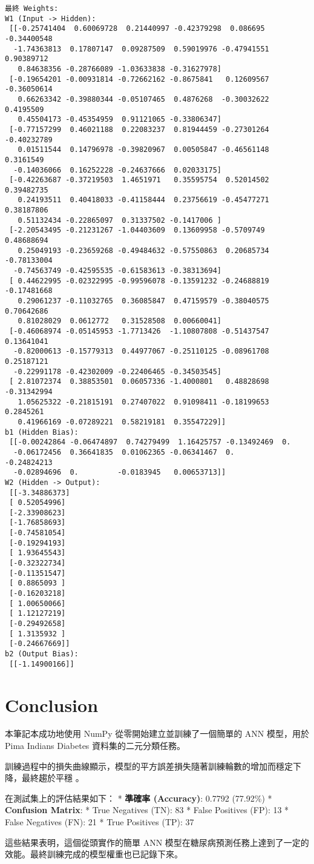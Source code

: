 \documentclass[11pt]{article}
\begin{document}
    \begin{Verbatim}[commandchars=\\\{\}]
最終 Weights:
W1 (Input -> Hidden):
 [[-0.25741404  0.60069728  0.21440997 -0.42379298  0.086695   -0.34400548
  -1.74363813  0.17807147  0.09287509  0.59019976 -0.47941551  0.90389712
   0.84638356 -0.28766089 -1.03633838 -0.31627978]
 [-0.19654201 -0.00931814 -0.72662162 -0.8675841   0.12609567 -0.36050614
   0.66263342 -0.39880344 -0.05107465  0.4876268  -0.30032622  0.4195509
   0.45504173 -0.45354959  0.91121065 -0.33806347]
 [-0.77157299  0.46021188  0.22083237  0.81944459 -0.27301264 -0.40232789
   0.01511544  0.14796978 -0.39820967  0.00505847 -0.46561148  0.3161549
  -0.14036066  0.16252228 -0.24637666  0.02033175]
 [-0.42263687 -0.37219503  1.4651971   0.35595754  0.52014502  0.39482735
   0.24193511  0.40418033 -0.41158444  0.23756619 -0.45477271  0.38187806
   0.51132434 -0.22865097  0.31337502 -0.1417006 ]
 [-2.20543495 -0.21231267 -1.04403609  0.13609958 -0.5709749   0.48688694
   0.25049193 -0.23659268 -0.49484632 -0.57550863  0.20685734 -0.78133004
  -0.74563749 -0.42595535 -0.61583613 -0.38313694]
 [ 0.44622995 -0.02322995 -0.99596078 -0.13591232 -0.24688819 -0.17481668
   0.29061237 -0.11032765  0.36085847  0.47159579 -0.38040575  0.70642686
   0.81028029  0.0612772   0.31528508  0.00660041]
 [-0.46068974 -0.05145953 -1.7713426  -1.10807808 -0.51437547  0.13641041
  -0.82000613 -0.15779313  0.44977067 -0.25110125 -0.08961708  0.25187121
  -0.22991178 -0.42302009 -0.22406465 -0.34503545]
 [ 2.81072374  0.38853501  0.06057336 -1.4000801   0.48828698 -0.31342994
   1.05625322 -0.21815191  0.27407022  0.91098411 -0.18199653  0.2845261
   0.41966169 -0.07289221  0.58219181  0.35547229]]
b1 (Hidden Bias):
 [[-0.00242864 -0.06474897  0.74279499  1.16425757 -0.13492469  0.
  -0.06172456  0.36641835  0.01062365 -0.06341467  0.         -0.24824213
  -0.02894696  0.         -0.0183945   0.00653713]]
W2 (Hidden -> Output):
 [[-3.34886373]
 [ 0.52054996]
 [-2.33908623]
 [-1.76858693]
 [-0.74581054]
 [-0.19294193]
 [ 1.93645543]
 [-0.32322734]
 [-0.11351547]
 [ 0.8865093 ]
 [-0.16203218]
 [ 1.00650066]
 [ 1.12127219]
 [-0.29492658]
 [ 1.3135932 ]
 [-0.24667669]]
b2 (Output Bias):
 [[-1.14900166]]
    \end{Verbatim}

    \section{Conclusion}\label{conclusion}

本筆記本成功地使用 NumPy 從零開始建立並訓練了一個簡單的 ANN 模型，用於
Pima Indians Diabetes 資料集的二元分類任務。

訓練過程中的損失曲線顯示，模型的平方誤差損失隨著訓練輪數的增加而穩定下降，最終趨於平穩
。

在測試集上的評估結果如下： * \textbf{準確率 (Accuracy)}: 0.7792
(77.92\%) * \textbf{Confusion Matrix}: * True Negatives (TN): 83 * False
Positives (FP): 13 * False Negatives (FN): 21 * True Positives (TP): 37

這些結果表明，這個從頭實作的簡單 ANN
模型在糖尿病預測任務上達到了一定的效能。最終訓練完成的模型權重也已記錄下來。


    
    
    
\end{document}
